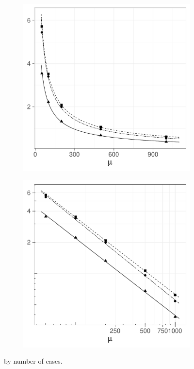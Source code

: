 \begin{figure}[htbp]
    \begin{subfigure}[b]{0.49\textwidth}
        \includegraphics[width=\textwidth]{results/by_num_cases/NMISE-vs-cases}
        \label{fig:ise:unif_NCases_1h:nmise}
    \end{subfigure}
    \begin{subfigure}[b]{0.49\textwidth}
        \includegraphics[width=\textwidth]{results/by_num_cases/NMISE-vs-cases-log-log}
        \label{fig:ise:unif_NCases_1h:nmise_log_log}
    \end{subfigure}
    \caption[ by number of cases]{ by number of cases. \errorplotcaption}
    \label{fig:ise:unif_NCases_1h}
\end{figure}

